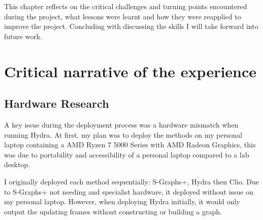 %

This chapter reflects on the critical challenges and turning points encountered during the project, what lessons were learnt and how they were reapplied to improve the project. Concluding with discussing the skills I will take forward into future work.

\section{Critical narrative of the experience}\label{sec:ref:challenges}

\subsection{Hardware Research}\label{sec:ref:hardware-research}

A key issue during the deployment process was a hardware mismatch when running Hydra. At first, my plan was to deploy the methods on my personal laptop containing a AMD Ryzen 7 5000 Series with AMD Radeon Graphics, this was due to portability and accessibility of a personal laptop compared to a lab desktop. 

I originally deployed each method sequentially: S-Graphs+, Hydra then Clio. Due to S-Graphs+ not needing and specialist hardware, it deployed without issue on my personal laptop. However, when deploying Hydra initially, it would only output the updating frames without constructing or building a graph. 

